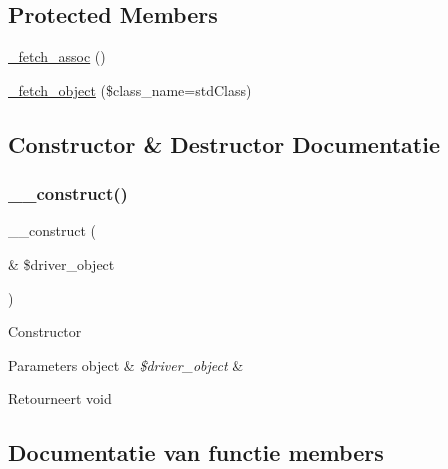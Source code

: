 \subsection*{Protected Members}
\begin{DoxyCompactItemize}
\item 
\mbox{\hyperlink{class_c_i___d_b__sqlsrv__result_a43a9a92817f1334a1c10752ec44275a0}{\+\_\+fetch\+\_\+assoc}} ()
\item 
\mbox{\hyperlink{class_c_i___d_b__sqlsrv__result_a60806be6a9c2488820813c2a7f4fef71}{\+\_\+fetch\+\_\+object}} (\$class\+\_\+name=\textquotesingle{}std\+Class\textquotesingle{})
\end{DoxyCompactItemize}


\subsection{Constructor \& Destructor Documentatie}
\mbox{\label{class_c_i___d_b__sqlsrv__result_a8e093c8b6e5733bc3f306385ee426ab7}} 
\subsubsection{\texorpdfstring{\_\_construct()}{\_\_construct()}}
{\footnotesize\ttfamily \+\_\+\+\_\+construct (\begin{DoxyParamCaption}\item[{\&}]{\$driver\+\_\+object }\end{DoxyParamCaption})}

Constructor


\begin{DoxyParams}[1]{Parameters}
object & {\em \$driver\+\_\+object} & \\
\hline
\end{DoxyParams}
\begin{DoxyReturn}{Retourneert}
void 
\end{DoxyReturn}


\subsection{Documentatie van functie members}
\mbox{\label{class_c_i___d_b__sqlsrv__result_a43a9a92817f1334a1c10752ec44275a0}} 
